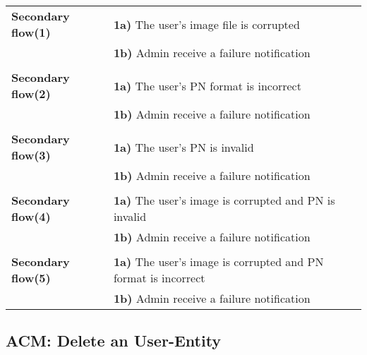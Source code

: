 \documentclass[a4paper,11pt]{article}
\begin{document}
\begin{tabular}{|p{3.5cm}|p{11.5cm}|}
    \textbf{Secondary flow(1)} & 
    \textbf{1a)} The user's image file is corrupted \\&
    \textbf{1b)} Admin receive a failure notification
     
    \\ \hline \rowcolor{Gray} & \\ \hline 
     
    \textbf{Secondary flow(2)} & 
    \textbf{1a)} The user's PN format is incorrect \\&
    \textbf{1b)} Admin receive a failure notification
    
   \\ \hline \rowcolor{Gray} & \\ \hline
    
    \textbf{Secondary flow(3)} & 
    \textbf{1a)} The user's PN is invalid \\&
    \textbf{1b)} Admin receive a failure notification
    
    \\ \hline \rowcolor{Gray} & \\ \hline
    
    \textbf{Secondary flow(4)} & 
    \textbf{1a)} The user's image is corrupted and PN is invalid\\&
    \textbf{1b)} Admin receive a failure notification
    
    \\ \hline \rowcolor{Gray} & \\ \hline
    
    \textbf{Secondary flow(5)} & 
    \textbf{1a)} The user's image is corrupted and PN format is incorrect\\&
    \textbf{1b)} Admin receive a failure notification
    
    \\\hline 
\end{tabular}


\newpage
\noindent

\subsection{ACM: Delete an User-Entity}
\end{document}
